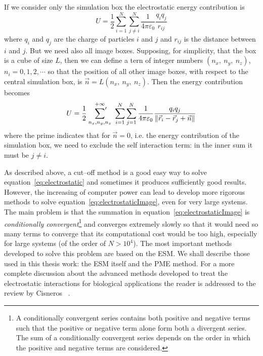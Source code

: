 If we consider only the simulation box the electrostatic energy contribution is
\begin{equation}
	U = \frac{1}{2}\sum_{i=1}^N\sum_{j\ne i}^N\frac{1}{4\pi\varepsilon_0}\frac{q_iq_j}{r_{ij}}
	\label{eq:electrostatic}
\end{equation}
where $q_i$ and $q_j$ are the charge of particles $i$ and $j$ and $r_{ij}$ is the distance between $i$ and $j$.
But we need also all image boxes. Supposing, for simplicity, that the box is a cube of size $L$, then we can
define a tern of integer numbers $(n_x,\ n_y,\ n_z)$, $n_i=0,1,2,\cdots$ so that the position of all other image
boxes, with respect to the central simulation box, is $\vec n = L (n_x,\ n_y,\ n_z)$. Then the energy
contribution becomes
\begin{equation}
	U = \frac{1}{2}\ \sideset{}{'}\sum_{n_x,n_y,n_z}^{+\infty}\ \sum_{i=1}^N\sum_{j=1}^N\frac{1}{4\pi\varepsilon_0}\frac{q_iq_j}{\|\vec r_i - \vec r_j + \vec n \|}
	\label{eq:electrostaticImage}
\end{equation}
where the prime indicates that for $\vec n = 0$, i.e. the energy contribution of the simulation box, we need to
exclude the self interaction term: in the inner sum it must be $j \ne i$.

As described above, a cut--off method is a good easy way to solve equation~\eqref{eq:electrostatic} and sometimes
it produces sufficiently good results. However, the increasing of computer power can lead to develop more
rigorous methods to solve equation~\eqref{eq:electrostaticImage}, even for very large systems. The main problem
is that the summation in equation~\eqref{eq:electrostaticImage} is \textit{conditionally convergent}\footnote{A
conditionally convergent series contains both positive and negative terms such that the positive or negative term
alone form both a divergent series. The sum of a conditionally convergent series depends on the order in which
the positive and negative terms are considered.} and converges extremely slowly so that it would need so many
terms to converge that its computational cost would be too high, especially for large systems (of the order of
$N > 10^4$). The most important methods developed to solve this problem are based on the \ac{ESM}. We shall
describe those used in this thesis work: the \ac{ESM} itself and the \ac{PME} method. For a more complete
discussion about the advanced methods developed to treat the electrostatic interactions for biological
applications the reader is addressed to the review by Cisneros \etal\, \cite{Cisneros}.


